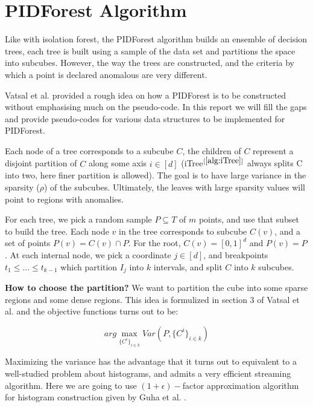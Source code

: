 \section{PIDForest Algorithm}
\label{sec:pidforest-algorithm}

Like with isolation forest, the PIDForest algorithm builds an ensemble of decision trees, each tree is built using a sample of the data set and partitions the space into subcubes.
However, the way the trees are constructed, and the criteria by which a point is declared anomalous are very different.

Vatsal et al. \cite{NIPS2019_9710} provided a rough idea on how a PIDForest is to be constructed without emphasising much on the pseudo-code.
In this report we will fill the gaps and provide pseudo-codes for various data structures to be implemented for PIDForest.

Each node of a tree corresponds to a subcube $C$, the children of $C$ represent a disjoint partition of $C$ along some axis $i \in [d]$ (iTree$^{[\ref{alg:iTree}]}$ always splits C into two, here finer partition is allowed).
The goal is to have large variance in the sparsity ($\rho$) of the subcubes. 
Ultimately, the leaves with large sparsity values will point to regions with anomalies.

For each tree, we pick a random sample $P \subseteq T$ of $m$ points, and use that subset to build the tree.
Each node $v$ in the tree corresponds to subcube $C(v)$, and a set of points $P(v) = C(v) \cap P$.
For the root, $C(v) = [0, 1]^d$ and $P (v) = P$.
At each internal node, we pick a coordinate $j \in [d]$, and breakpoints $t_{1} \leq ... \leq t_{k-1}$ which partition $I_j$ into $k$ intervals, and split $C$ into $k$ subcubes. 

\textbf{How to choose the partition?} We want to partition the cube into some sparse regions and some dense regions. 
This idea is formulized in section 3 of Vatsal et al. \cite{NIPS2019_9710} and the objective functions turns out to be:

\vspace{-2em}
\begin{equation}
    \label{eq:maximizing-variance}
        arg \max_{ \{ C^i \}_{i \in k} } Var(P, \{ C^i \}_{i \in k})
\end{equation}

Maximizing the variance has the advantage that it turns out to equivalent to a well-studied problem about histograms, and admits a very efficient streaming algorithm.
Here we are going to use $(1+ \epsilon)-$factor approximation algorithm for histogram construction given by Guha et al. \cite{10.1145/1132863.1132873}.


